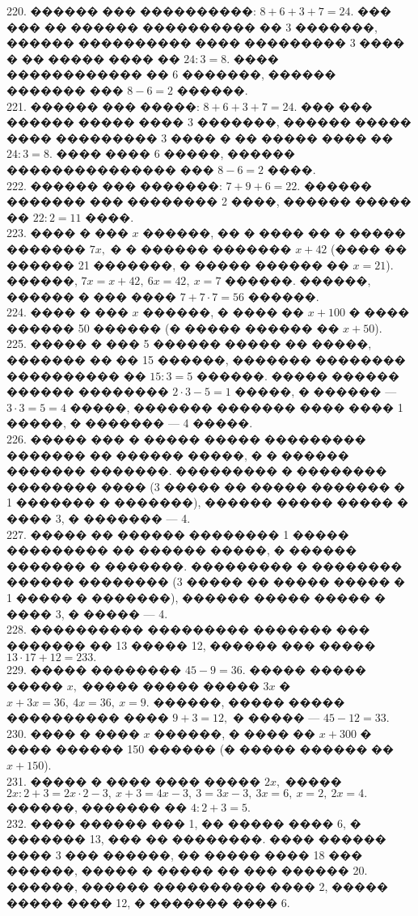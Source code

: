 \documentclass[12pt]{article}
\begin{document}
220. ������ ��� ����������: $8+6+3+7=24.$ ��� ��� �� ������ ���������� �� 3 �������, ������ ���������� ���� ��������� 3 ���� � �� ����� ���� �� $24:3=8.$ ���� ������������ �� 6 �������, ������ ������� ��� $8-6=2$ ������.\\
221. ������ ��� �����: $8+6+3+7=24.$ ��� ��� ������ ����� ���� 3 �������, ������ ����� ���� ��������� 3 ���� � �� ����� ���� �� $24:3=8.$ ���� ���� 6 �����, ������ ��������������� ��� $8-6=2$ ����.\\
222. ������ ��� �������: $7+9+6=22.$ ������ ������� ��� �������� 2 ����, ������ ����� �� $22:2=11$ ����.\\
223. ���� � ��� $x$ ������, �� � ���� �� � ����� ������� $7x,$ � � ������ ������� $x+42$ (���� �� ������ 21 �������, � ����� ������ �� $x=21$). ������, $7x=x+42,\ 6x=42,\ x=7$ ������. ������, ������ � ��� ���� $7+7\cdot7=56$ ������.\\
224. ���� � ��� $x$ ������, � ���� �� $x+100$ � ���� ������ 50 ������ (� ����� ������ �� $x+50$).\\
225. ����� � ��� 5 ������ ����� �� �����, ������� �� �� 15 ������, ������� �������� ���������� �� $15:3=5$ ������. ����� ������ ������ �������� $2\cdot3-5=1$ �����, � ������ --- $3\cdot3=5=4$ �����, ������� ������� ���� ���� 1 �����, � ������� --- 4 �����.\\
226. ����� ��� � ����� ����� ��������� ������� �� ������ �����, � � ������ ������� �������. ��������� � �������� �������� ���� (3 ����� �� ����� ������� � 1 ������� � �������), ������ ����� ����� � ���� 3, � ������� --- 4.\\
227. ����� �� ������ �������� 1 ����� ��������� �� ������ �����, � ������ ������� � �������. ��������� � �������� ������ �������� (3 ����� �� ����� ����� � 1 ����� � �������), ������ ����� ����� � ���� 3, � ����� --- 4.\\
228. ���������� ��������� ������� ��� ������� �� 13 ����� 12, ������ ��� ����� $13\cdot17+12=233.$\\
229. ����� �������� $45-9=36.$ ����� ����� ����� $x,$ ����� ����� ����� $3x$ � $x+3x=36,\ 4x=36,\ x=9.$ ������, ����� ����� ���������� ���� $9+3=12,$ � ����� --- $45-12=33.$\\
230. ���� � ���� $x$ ������, � ���� �� $x+300$ � ���� ������ 150 ������ (� ����� ������ �� $x+150$).\\
231. ����� � ���� ���� ����� $2x,$ ����� $2x:2+3=2x\cdot2-3,\ x+3=4x-3,\ 3=3x-3,\ 3x=6,\ x=2,\ 2x=4.$ ������, ������� �� $4:2+3=5.$\\
232. ���� ������ ��� 1, �� ����� ���� 6, � ������� 13, ��� �� ��������. ���� ������ ���� 3 ��� ������, �� ����� ���� 18 ��� ������, ����� � ����� �� ��� ������ 20. ������, ������ ���������� ���� 2, ����� ����� ���� 12, � ������� ���� 6.\\
\end{document}
